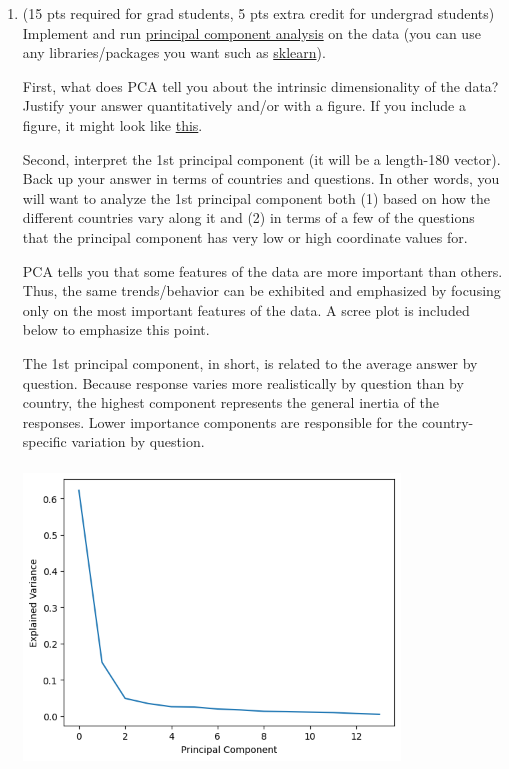 \documentclass{article}
\begin{document}
\begin{enumerate}[label=(\alph*)]
\begin{mdframed}
    \end{mdframed}

    \item (15 pts required for grad students, 5 pts extra credit for undergrad students) Implement and run \href{https://en.wikipedia.org/wiki/Principal_component_analysis}{principal component analysis} on the data (you can use any libraries/packages you want such as \href{https://scikit-learn.org/stable/modules/generated/sklearn.decomposition.PCA.html}{sklearn}).
    
    First, what does PCA tell you about the intrinsic dimensionality of the data? Justify your answer quantitatively and/or with a figure. If you include a figure, it might look like \href{https://en.wikipedia.org/wiki/Scree_plot}{this}.
    
    Second, interpret the 1st principal component (it will be a length-180 vector). Back up your answer in terms of countries and questions. In other words, you will want to analyze the 1st principal component both (1) based on how the different countries vary along it and (2) in terms of a few of the questions that the principal component has very low or high coordinate values for. 

    \bigskip

    \begin{mdframed}
        PCA tells you that some features of the data are more important than others. Thus, the same trends/behavior can be exhibited and emphasized by focusing only on the most important features of the data. A scree plot is included below to emphasize this point. 


        The 1st principal component, in short, is related to the average answer by question. Because response varies more realistically by question than by country, the highest component represents the general inertia of the responses.
        Lower importance components are responsible for the country-specific variation by question.

    \end{mdframed}

    \includegraphics[width=10cm, height=8cm]{scree.png}


\end{enumerate}
\end{document}
